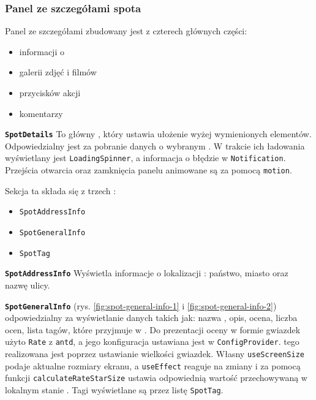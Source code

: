 
\subsubsection{Panel ze szczegółami spota}
\label{subsubsec:panel-ze-szczegolami-spota}

Panel ze szczegółami  zbudowany jest z czterech głównych części:
\begin{itemize}
    \item informacji o 
    \item galerii zdjęć i filmów
    \item przycisków akcji
    \item komentarzy 
\end{itemize}

\textbf{\texttt{SpotDetails}}
To główny , który ustawia ułożenie wyżej wymienionych elementów.
Odpowiedzialny jest za pobranie danych o wybranym .
W trakcie ich ładowania wyświetlany jest \texttt{LoadingSpinner}, a informacja o błędzie w
\texttt{Notification}.
Przejścia otwarcia oraz zamknięcia panelu animowane są za pomocą  \texttt{motion}.

\label{subsubsec:informacje-o-spocie}

Sekcja ta składa się z trzech :
\begin{itemize}
    \item \texttt{SpotAddressInfo}
    \item \texttt{SpotGeneralInfo}
    \item \texttt{SpotTag}
\end{itemize}

\textbf{\texttt{SpotAddressInfo}}
Wyświetla informacje o lokalizacji : państwo, miasto oraz nazwę ulicy.


\textbf{\texttt{SpotGeneralInfo}} (rys. \ref{fig:spot-general-info-1} i \ref{fig:spot-general-info-2})
 odpowiedzialny za wyświetlanie danych takich jak: nazwa ,
opis, ocena, liczba ocen, lista tagów, które przyjmuje w .
Do prezentacji oceny w formie gwiazdek użyto \texttt{Rate} z  \texttt{antd},
a jego konfiguracja ustawiana jest w \texttt{ConfigProvider}.
 tego  realizowana jest poprzez
ustawianie wielkości gwiazdek.
Własny  \texttt{useScreenSize} podaje aktualne rozmiary ekranu, a
\texttt{useEffect} reaguje na zmiany i za pomocą funkcji \texttt{calculateRateStarSize} ustawia
odpowiednią wartość przechowywaną w lokalnym stanie .
Tagi wyświetlane są przez listę \texttt{SpotTag}.


